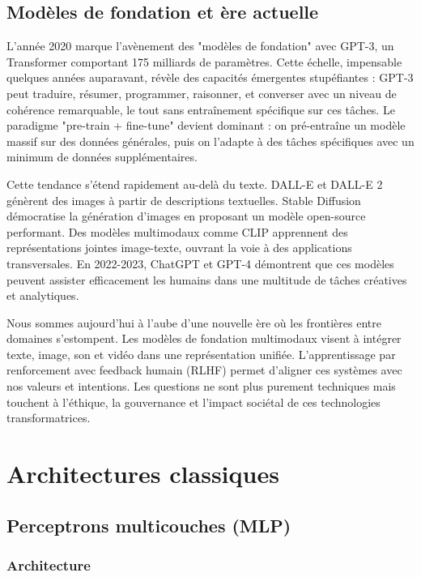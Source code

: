 \subsection{Modèles de fondation et ère actuelle}

L'année 2020 marque l'avènement des "modèles de fondation" avec GPT-3, un Transformer comportant 175 milliards de paramètres. Cette échelle, impensable quelques années auparavant, révèle des capacités émergentes stupéfiantes : GPT-3 peut traduire, résumer, programmer, raisonner, et converser avec un niveau de cohérence remarquable, le tout sans entraînement spécifique sur ces tâches. Le paradigme "pre-train + fine-tune" devient dominant : on pré-entraîne un modèle massif sur des données générales, puis on l'adapte à des tâches spécifiques avec un minimum de données supplémentaires.

Cette tendance s'étend rapidement au-delà du texte. DALL-E et DALL-E 2 génèrent des images à partir de descriptions textuelles. Stable Diffusion démocratise la génération d'images en proposant un modèle open-source performant. Des modèles multimodaux comme CLIP apprennent des représentations jointes image-texte, ouvrant la voie à des applications transversales. En 2022-2023, ChatGPT et GPT-4 démontrent que ces modèles peuvent assister efficacement les humains dans une multitude de tâches créatives et analytiques.

Nous sommes aujourd'hui à l'aube d'une nouvelle ère où les frontières entre domaines s'estompent. Les modèles de fondation multimodaux visent à intégrer texte, image, son et vidéo dans une représentation unifiée. L'apprentissage par renforcement avec feedback humain (RLHF) permet d'aligner ces systèmes avec nos valeurs et intentions. Les questions ne sont plus purement techniques mais touchent à l'éthique, la gouvernance et l'impact sociétal de ces technologies transformatrices.

\section{Architectures classiques}

\subsection{Perceptrons multicouches (MLP)}

\subsubsection{Architecture}

